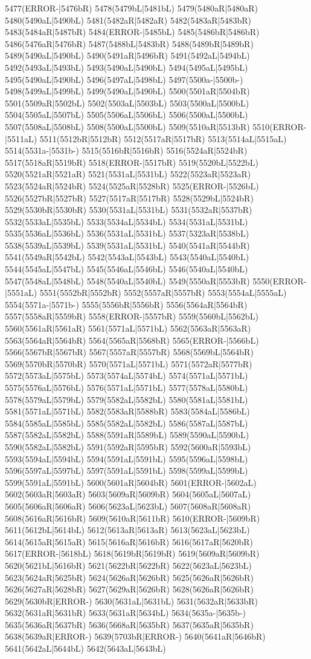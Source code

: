 5477(ERROR-|5476bR) 5478(5479bL|5481bL) 5479(5480aR|5480aR) 5480(5490aL|5490bL) 5481(5482aR|5482aR) 5482(5483aR|5483bR) 5483(5484aR|5487bR) 5484(ERROR-|5485bL) 5485(5486bR|5486bR) 5486(5476aR|5476bR) 5487(5488bL|5483bR) 5488(5489bR|5489bR) 5489(5490aL|5490bL) 5490(5491aR|5496bR) 5491(5492aL|5494bL) 5492(5493aL|5493bL) 5493(5490aL|5490bL) 5494(5495aL|5495bL) 5495(5490aL|5490bL) 5496(5497aL|5498bL) 5497(5500a-|5500b-) 5498(5499aL|5499bL) 5499(5490aL|5490bL) 5500(5501aR|5504bR) 5501(5509aR|5502bL) 5502(5503aL|5503bL) 5503(5500aL|5500bL) 5504(5505aL|5507bL) 5505(5506aL|5506bL) 5506(5500aL|5500bL) 5507(5508aL|5508bL) 5508(5500aL|5500bL) 5509(5510aR|5513bR) 5510(ERROR-|5511aL) 5511(5512bR|5512bR) 5512(5517aR|5517bR) 5513(5514aL|5515aL) 5514(5531a-|5531b-) 5515(5516bR|5516bR) 5516(5524aR|5524bR) 5517(5518aR|5519bR) 5518(ERROR-|5517bR) 5519(5520bL|5522bL) 5520(5521aR|5521aR) 5521(5531aL|5531bL) 5522(5523aR|5523aR) 5523(5524aR|5524bR) 5524(5525aR|5528bR) 5525(ERROR-|5526bL) 5526(5527bR|5527bR) 5527(5517aR|5517bR) 5528(5529bL|5524bR) 5529(5530bR|5530bR) 5530(5531aL|5531bL) 5531(5532aR|5537bR) 5532(5533aL|5535bL) 5533(5534aL|5534bL) 5534(5531aL|5531bL) 5535(5536aL|5536bL) 5536(5531aL|5531bL) 5537(5323aR|5538bL) 5538(5539aL|5539bL) 5539(5531aL|5531bL) 5540(5541aR|5544bR) 5541(5549aR|5542bL) 5542(5543aL|5543bL) 5543(5540aL|5540bL) 5544(5545aL|5547bL) 5545(5546aL|5546bL) 5546(5540aL|5540bL) 5547(5548aL|5548bL) 5548(5540aL|5540bL) 5549(5550aR|5553bR) 5550(ERROR-|5551aL) 5551(5552bR|5552bR) 5552(5557aR|5557bR) 5553(5554aL|5555aL) 5554(5571a-|5571b-) 5555(5556bR|5556bR) 5556(5564aR|5564bR) 5557(5558aR|5559bR) 5558(ERROR-|5557bR) 5559(5560bL|5562bL) 5560(5561aR|5561aR) 5561(5571aL|5571bL) 5562(5563aR|5563aR) 5563(5564aR|5564bR) 5564(5565aR|5568bR) 5565(ERROR-|5566bL) 5566(5567bR|5567bR) 5567(5557aR|5557bR) 5568(5569bL|5564bR) 5569(5570bR|5570bR) 5570(5571aL|5571bL) 5571(5572aR|5577bR) 5572(5573aL|5575bL) 5573(5574aL|5574bL) 5574(5571aL|5571bL) 5575(5576aL|5576bL) 5576(5571aL|5571bL) 5577(5578aL|5580bL) 5578(5579aL|5579bL) 5579(5582aL|5582bL) 5580(5581aL|5581bL) 5581(5571aL|5571bL) 5582(5583aR|5588bR) 5583(5584aL|5586bL) 5584(5585aL|5585bL) 5585(5582aL|5582bL) 5586(5587aL|5587bL) 5587(5582aL|5582bL) 5588(5591aR|5589bL) 5589(5590aL|5590bL) 5590(5582aL|5582bL) 5591(5592aR|5595bR) 5592(5600aR|5593bL) 5593(5594aL|5594bL) 5594(5591aL|5591bL) 5595(5596aL|5598bL) 5596(5597aL|5597bL) 5597(5591aL|5591bL) 5598(5599aL|5599bL) 5599(5591aL|5591bL) 5600(5601aR|5604bR) 5601(ERROR-|5602aL) 5602(5603aR|5603aR) 5603(5609aR|5609bR) 5604(5605aL|5607aL) 5605(5606aR|5606aR) 5606(5623aL|5623bL) 5607(5608aR|5608aR) 5608(5616aR|5616bR) 5609(5610aR|5611bR) 5610(ERROR-|5609bR) 5611(5612bL|5614bL) 5612(5613aR|5613aR) 5613(5623aL|5623bL) 5614(5615aR|5615aR) 5615(5616aR|5616bR) 5616(5617aR|5620bR) 5617(ERROR-|5618bL) 5618(5619bR|5619bR) 5619(5609aR|5609bR) 5620(5621bL|5616bR) 5621(5622bR|5622bR) 5622(5623aL|5623bL) 5623(5624aR|5625bR) 5624(5626aR|5626bR) 5625(5626aR|5626bR) 5626(5627aR|5628bR) 5627(5629aR|5626bR) 5628(5626aR|5626bR) 5629(5630bR|ERROR-) 5630(5631aL|5631bL) 5631(5632aR|5633bR) 5632(5631aR|5631bR) 5633(5631aR|5634bL) 5634(5635a-|5635b-) 5635(5636aR|5637bR) 5636(5668aR|5635bR) 5637(5635aR|5635bR) 5638(5639aR|ERROR-) 5639(5703bR|ERROR-) 5640(5641aR|5646bR) 5641(5642aL|5644bL) 5642(5643aL|5643bL) 